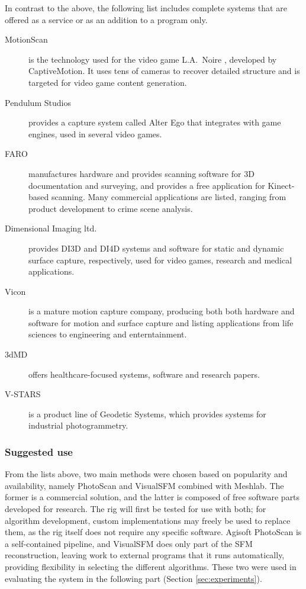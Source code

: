 In contrast to the above, the following list includes complete systems that are offered as a service or as an addition to a program only.

\begin{description}
	\item[MotionScan] is the technology used for the video game L.A.\ Noire \cite{rockstar2011noire}, developed by CaptiveMotion.
		It uses tens of cameras to recover detailed structure and is targeted for video game content generation.

	\item[Pendulum Studios] \cite{alterego} provides a capture system called Alter Ego that integrates with game engines, used in several video games.

	\item [FARO] \cite{faro} manufactures hardware and provides scanning software for 3D documentation and surveying, and provides a free application for Kinect-based scanning.
		Many commercial applications are listed, ranging from product development to crime scene analysis.

	\item[Dimensional Imaging ltd.] \cite{di4d} provides DI3D and DI4D systems and software for static and dynamic surface capture, respectively, used for video games, research and medical applications.

	\item[Vicon] \cite{vicon} is a mature motion capture company, producing both both hardware and software for motion and surface capture and listing applications from life sciences to engineering and enterntainment.

	\item[3dMD] \cite{3dmd} offers healthcare-focused systems, software and research papers.

	\item[V-STARS] \cite{vstars} is a product line of Geodetic Systems, which provides systems for industrial photogrammetry.
\end{description}

\subsubsection{Suggested use} %

From the lists above, two main methods were chosen based on popularity and availability, namely PhotoScan and VisualSFM combined with Meshlab.
The former is a commercial solution, and the latter is composed of free software parts developed for research.
The rig will first be tested for use with both; for algorithm development, custom implementations may freely be used to replace them, as the rig itself does not require any specific software.
Agisoft PhotoScan is a self-contained pipeline, and VisualSFM does only part of the SFM reconstruction, leaving work to external programs that it runs automatically, providing flexibility in selecting the different algorithms.
These two were used in evaluating the system in the following part (Section \ref{sec:experiments}).

